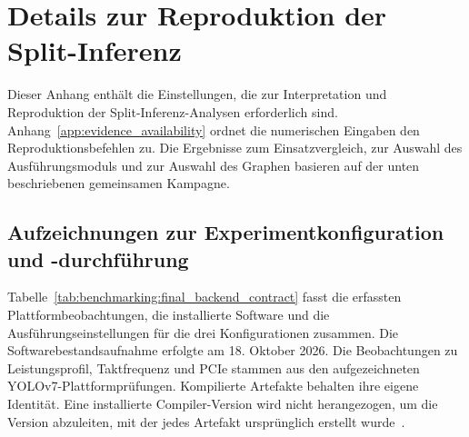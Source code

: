 \section{Details zur Reproduktion der Split-Inferenz}
\label{app:split_reproduction}

Dieser Anhang enthält die Einstellungen, die zur Interpretation und Reproduktion der Split-Inferenz-Analysen erforderlich sind. Anhang~\ref{app:evidence_availability} ordnet die numerischen Eingaben den Reproduktionsbefehlen zu. Die Ergebnisse zum Einsatzvergleich, zur Auswahl des Ausführungsmoduls und zur Auswahl des Graphen basieren auf der unten beschriebenen gemeinsamen Kampagne.

\subsection{Aufzeichnungen zur Experimentkonfiguration und -durchführung}
\label{app:split_records}

Tabelle~\ref{tab:benchmarking:final_backend_contract} fasst die erfassten Plattformbeobachtungen, die installierte Software und die Ausführungseinstellungen für die drei Konfigurationen zusammen. Die Softwarebestandsaufnahme erfolgte am 18. Oktober 2026. Die Beobachtungen zu Leistungsprofil, Taktfrequenz und PCIe stammen aus den aufgezeichneten YOLOv7-Plattformprüfungen. Kompilierte Artefakte behalten ihre eigene Identität. Eine installierte Compiler-Version wird nicht herangezogen, um die Version abzuleiten, mit der jedes Artefakt ursprünglich erstellt wurde~\cite{edgeAIResults2026,v49Confirmation2026}.

